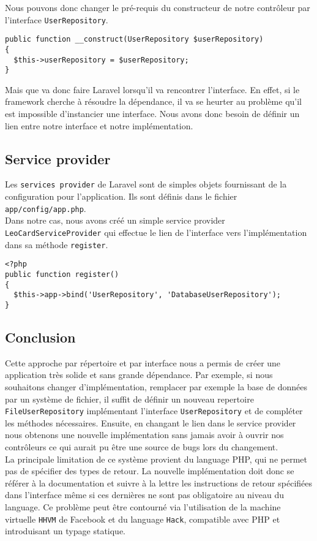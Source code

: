 Nous pouvons donc changer le pré-requis du constructeur de notre contrôleur par l'interface \verb|UserRepository|.
\begin{verbatim}
public function __construct(UserRepository $userRepository)
{
  $this->userRepository = $userRepository;
}
\end{verbatim}

Mais que va donc faire Laravel lorsqu'il va rencontrer l'interface. En effet, si le framework cherche à résoudre la dépendance, il va se heurter au problème qu'il est impossible d'instancier une interface. Nous avons donc besoin de définir un lien entre notre interface et notre implémentation.

\subsection{Service provider}

Les \verb|services provider| de Laravel sont de simples objets fournissant de la configuration pour l'application. Ils sont définis dans le fichier \verb|app/config/app.php|.\\

Dans notre cas, nous avons créé un simple service provider \verb|LeoCardServiceProvider| qui effectue le lien de l'interface vers l'implémentation dans sa méthode \verb|register|.
\begin{verbatim}
<?php
public function register()
{
  $this->app->bind('UserRepository', 'DatabaseUserRepository');
}
\end{verbatim}

\subsection{Conclusion}

Cette approche par répertoire et par interface nous a permis de créer une application très solide et sans grande dépendance. Par exemple, si nous souhaitons changer d'implémentation, remplacer par exemple la base de données par un système de fichier, il suffit de définir un nouveau repertoire \verb|FileUserRepository| implémentant l'interface \verb|UserRepository| et de compléter les méthodes nécessaires. Ensuite, en changant le lien dans le service provider nous obtenons une nouvelle implémentation sans jamais avoir à ouvrir nos contrôleurs ce qui aurait pu être une source de bugs lors du changement.\\

La principale limitation de ce système provient du language PHP, qui ne permet pas de spécifier des types de retour. La nouvelle implémentation doit donc se référer à la documentation et suivre à la lettre les instructions de retour spécifiées dans l'interface même si ces dernières ne sont pas obligatoire au niveau du language. Ce problème peut être contourné via l'utilisation de la machine virtuelle \verb|HHVM| de Facebook et du language \verb|Hack|, compatible avec PHP et introduisant un typage statique.
